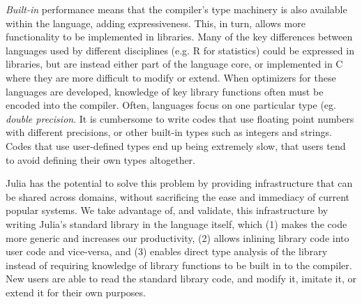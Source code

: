 \documentclass[9pt]{sigplanconf}
\begin{document}

{\it Built-in} performance means that the compiler's type machinery is
also available within the language, adding expressiveness. This, in
turn, allows more functionality to be implemented in libraries. Many
of the key differences between languages used by different disciplines
(e.g. R for statistics) could be expressed in libraries, but are
instead either part of the language core, or implemented in C where
they are more difficult to modify or extend. When optimizers for these
languages are developed, knowledge of key library functions often must
be encoded into the compiler. Often, languages focus on one particular
type (eg. {\it double precision}. It is cumbersome to write codes that
use floating point numbers with different precisions, or other
built-in types such as integers and strings. Codes that use
user-defined types end up being extremely slow, that users tend to
avoid defining their own types altogether.


Julia has the potential to solve this problem by providing
infrastructure that can be shared across domains, without sacrificing
the ease and immediacy of current popular systems.  We take advantage
of, and validate, this infrastructure by writing Julia's standard
library in the language itself, which (1) makes the code more generic
and increases our productivity, (2) allows inlining library code into
user code and vice-versa, and (3) enables direct type analysis of the
library instead of requiring knowledge of library functions to be
built in to the compiler. New users are able to read the standard
library code, and modify it, imitate it, or extend it for their own
purposes.


\end{document}
